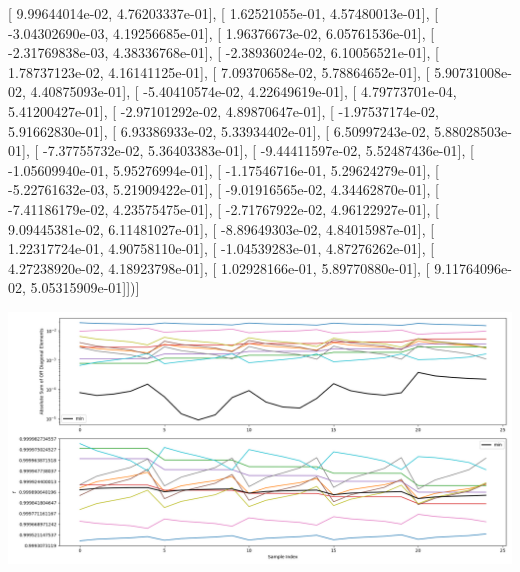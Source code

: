 \documentclass{article}
\begin{document}
       [  9.99644014e-02,   4.76203337e-01],
       [  1.62521055e-01,   4.57480013e-01],
       [ -3.04302690e-03,   4.19256685e-01],
       [  1.96376673e-02,   6.05761536e-01],
       [ -2.31769838e-03,   4.38336768e-01],
       [ -2.38936024e-02,   6.10056521e-01],
       [  1.78737123e-02,   4.16141125e-01],
       [  7.09370658e-02,   5.78864652e-01],
       [  5.90731008e-02,   4.40875093e-01],
       [ -5.40410574e-02,   4.22649619e-01],
       [  4.79773701e-04,   5.41200427e-01],
       [ -2.97101292e-02,   4.89870647e-01],
       [ -1.97537174e-02,   5.91662830e-01],
       [  6.93386933e-02,   5.33934402e-01],
       [  6.50997243e-02,   5.88028503e-01],
       [ -7.37755732e-02,   5.36403383e-01],
       [ -9.44411597e-02,   5.52487436e-01],
       [ -1.05609940e-01,   5.95276994e-01],
       [ -1.17546716e-01,   5.29624279e-01],
       [ -5.22761632e-03,   5.21909422e-01],
       [ -9.01916565e-02,   4.34462870e-01],
       [ -7.41186179e-02,   4.23575475e-01],
       [ -2.71767922e-02,   4.96122927e-01],
       [  9.09445381e-02,   6.11481027e-01],
       [ -8.89649303e-02,   4.84015987e-01],
       [  1.22317724e-01,   4.90758110e-01],
       [ -1.04539283e-01,   4.87276262e-01],
       [  4.27238920e-02,   4.18923798e-01],
       [  1.02928166e-01,   5.89770880e-01],
       [  9.11764096e-02,   5.05315909e-01]])]
\begin{center}
\includegraphics[scale=.9]{report_pickled_controls217/control_dpn_all.png}

\end{center}
\end{document}
